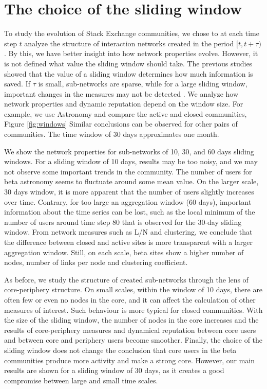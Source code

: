 \chapter{The choice of the sliding window} %
\label{App:sliding}

To study the evolution of Stack Exchange communities, we chose to at each time step $t$ analyze the structure of interaction networks created in the period $[t, t+\tau)$. By this, we have better insight into how network properties evolve. However, it is not defined what value the sliding window should take. The previous studies showed that the value of a sliding window determines how much information is saved. If $\tau$ is small, sub-networks are sparse, while for a large sliding window, important changes in the measures may not be detected \cite{krings2012effects, arnold2021moving}. We analyze how network properties and dynamic reputation depend on the window size. For example, we use Astronomy and compare the active and closed communities, Figure \ref{fig:windows} Similar conclusions can be observed for other pairs of communities. The time window of 30 days approximates one month.  

We show the network properties for sub-networks of 10, 30, and 60 days sliding windows. For a sliding window of 10 days, results may be too noisy, and we may not observe some important trends in the community. The number of users for beta astronomy seems to fluctuate around some mean value. On the larger scale, 30 days window,  it is more apparent that the number of users slightly increases over time. Contrary, for too large an aggregation window (60 days), important information about the time series can be lost, such as the local minimum of the number of users around time step 80 that is observed for the 30-day sliding window. 
From network measures such as L/N and clustering, we conclude that the difference between closed and active sites is more transparent with a larger aggregation window. Still, on each scale, beta sites show a higher number of nodes, number of links per node and clustering coefficient.

As before, we study the structure of created sub-networks through the lens of core-periphery structure. On small scales, within the window of 10 days, there are often few or even no nodes in the core, and it can affect the calculation of other measures of interest. Such behaviour is more typical for closed communities. With the size of the sliding window, the number of nodes in the core increases and the results of core-periphery measures and dynamical reputation between core users and between core and periphery users become smoother. Finally, the choice of the sliding window does not change the conclusion that core users in the beta communities produce more activity and make a strong core. However, our main results are shown for a sliding window of 30 days, as it creates a good compromise between large and small time scales.   

